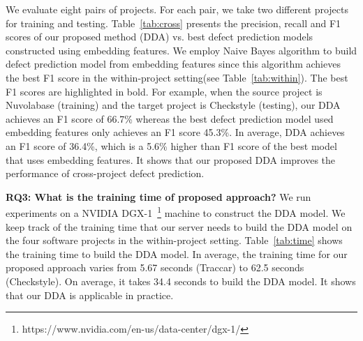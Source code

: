 We evaluate eight pairs of projects. For each pair, we take two different projects for training and testing. Table~\ref{tab:cross} presents the precision, recall and F1 scores of our proposed method (DDA) vs. best defect prediction models constructed using embedding features. We employ Naive Bayes algorithm to build defect prediction model from embedding features since this algorithm achieves the best F1 score in the within-project setting(see Table~\ref{tab:within}). The best F1 scores are highlighted in bold. For example, when the source project is Nuvolabase (training) and the target project is Checkstyle (testing), our DDA achieves an F1 score of 66.7\% whereas the best defect prediction model used embedding features only achieves an F1 score 45.3\%. In average, DDA achieves an F1 score of 36.4\%, which is a 5.6\% higher than F1 score of the best model that uses embedding features. It shows that our proposed DDA improves the performance of cross-project defect prediction. 

\textbf{RQ3: What is the training time of proposed approach?}
We run experiments on a NVIDIA DGX-1~\footnote{https://www.nvidia.com/en-us/data-center/dgx-1/} machine to construct the DDA model. We keep track of the training time that our server needs to build the DDA model on the four software projects in the within-project setting. Table~\ref{tab:time} shows the training time to build the DDA model. In average, the training time for our proposed approach varies from 5.67 seconds (Traccar) to 62.5 seconds (Checkstyle). On average, it takes 34.4 seconds to build the DDA model. It shows that our DDA is applicable in practice.


